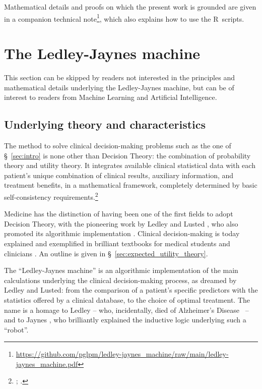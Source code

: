 \documentclass[utf8]{FrontiersinHarvard} %
\newcommand*{\sect}{\S}%
\newcommand*{\chaps}{chs}%
\renewcommand*{\|}[1][]{\nonscript\:#1\vert\nonscript\:\mathopen{}}
\newcommand*{\ad}{Alzheimer's Disease}
\newcommand*{\ljm}{Ledley-Jaynes machine}
\begin{document}
Mathematical details and proofs on which the present work is grounded are given in a companion technical note\footnote{\url{https://github.com/pglpm/ledley-jaynes\_machine/raw/main/ledley-jaynes\_machine.pdf}}, which also explains how to use the R~scripts.

\bigskip%
\section{The \ljm}
\label{sec:the_machine}

This section can be skipped by %
readers not interested in the principles and mathematical details underlying the \ljm, but can be of interest to readers from Machine Learning and Artificial Intelligence.

\subsection{Underlying theory and characteristics}
\label{sec:the_machine_principles}

The method to solve clinical decision-making problems such as the one of \sect~\ref{sec:intro} %
is none other than Decision Theory: the combination of probability theory and utility theory. It integrates available clinical statistical data with each patient's unique combination of clinical results, auxiliary information, and treatment benefits, in a mathematical framework, completely determined by basic self-consistency requirements.\footnote{\citet[\chaps~13--14]{jaynes1994_r2003}; \citet{vonneumannetal1944_r1955,cox1946,savage1954_r1972,luceetal1957,raiffaetal1961_r2000,raiffa1968_r1970,lindley1971_r1988,kreps1988}.}

Medicine has the distinction of having been one of the first fields to adopt Decision Theory, with the pioneering work by Ledley and Lusted \citeyearpar{ledleyetal1959,ledleyetal1959b,ledleyetal1960,lustedetal1960}, who also promoted its algorithmic implementation \citep[see especially \sect~1-5 p.~21]{ledley1959,ledley1960}. Clinical decision-making is today explained and exemplified in brilliant textbooks for medical students and clinicians \citep{weinsteinetal1980,soxetal1988_r2013,huninketal2001_r2014}. An outline is given in \sect~\ref{sec:expected_utility_theory}.

The \enquote{\ljm} is an algorithmic implementation of the main calculations underlying the clinical decision-making process, as dreamed by Ledley and Lusted: from the comparison of a patient's specific predictors with the statistics offered by a clinical database, to the choice of optimal treatment. The name is a homage to Ledley -- who, incidentally, died of \ad\ \citep{shahetal2013} -- and to Jaynes \citeyearpar{jaynes1994_r2003}, who brilliantly explained the inductive logic underlying such a \enquote{robot}.
\end{document}

